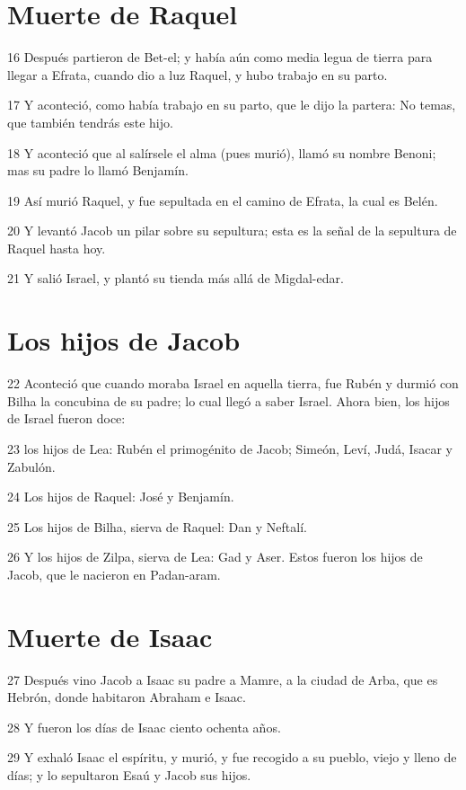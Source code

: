\section*{Muerte de Raquel}

\par 16 Después partieron de Bet-el; y había aún como media legua de tierra para llegar a Efrata, cuando dio a luz Raquel, y hubo trabajo en su parto.
\par 17 Y aconteció, como había trabajo en su parto, que le dijo la partera: No temas, que también tendrás este hijo.
\par 18 Y aconteció que al salírsele el alma (pues murió), llamó su nombre Benoni; mas su padre lo llamó Benjamín.
\par 19 Así murió Raquel, y fue sepultada en el camino de Efrata, la cual es Belén.
\par 20 Y levantó Jacob un pilar sobre su sepultura; esta es la señal de la sepultura de Raquel hasta hoy.
\par 21 Y salió Israel, y plantó su tienda más allá de Migdal-edar.

\section*{Los hijos de Jacob}

\par 22 Aconteció que cuando moraba Israel en aquella tierra, fue Rubén y durmió con Bilha la concubina de su padre; lo cual llegó a saber Israel. Ahora bien, los hijos de Israel fueron doce:
\par 23 los hijos de Lea: Rubén el primogénito de Jacob; Simeón, Leví, Judá, Isacar y Zabulón.
\par 24 Los hijos de Raquel: José y Benjamín.
\par 25 Los hijos de Bilha, sierva de Raquel: Dan y Neftalí.
\par 26 Y los hijos de Zilpa, sierva de Lea: Gad y Aser. Estos fueron los hijos de Jacob, que le nacieron en Padan-aram.

\section*{Muerte de Isaac}

\par 27 Después vino Jacob a Isaac su padre a Mamre, a la ciudad de Arba, que es Hebrón, donde habitaron Abraham e Isaac.
\par 28 Y fueron los días de Isaac ciento ochenta años.
\par 29 Y exhaló Isaac el espíritu, y murió, y fue recogido a su pueblo, viejo y lleno de días; y lo sepultaron Esaú y Jacob sus hijos.

